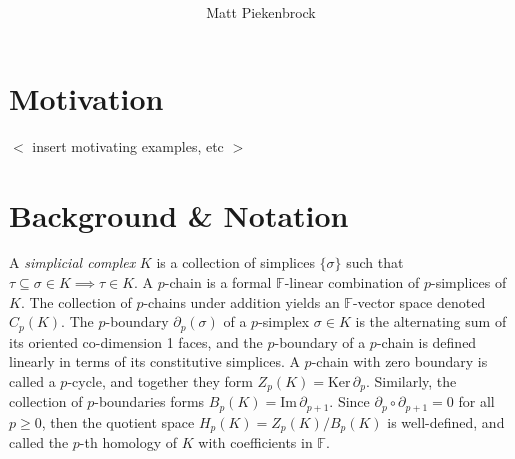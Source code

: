 \documentclass[10pt]{article}
\title{\vspace{-2.0em} \vspace{-0.5em}}
\author{Matt Piekenbrock}
\date{}
\begin{document}
\noindent

\section{Motivation}
$<$ insert motivating examples, etc $>$

\section{Background \& Notation}
A \emph{simplicial complex} $K$ is a collection of simplices $\{\sigma\}$ such that $\tau \subseteq \sigma \in K \implies \tau \in K$. A $p$-chain is a formal $\mathbb{F}$-linear combination of $p$-simplices of $K$. The collection of $p$-chains under addition yields an $\mathbb{F}$-vector space denoted $C_p(K)$. 
The $p$-boundary $\partial_p(\sigma)$ of a $p$-simplex $\sigma\in K$ is the alternating sum of its oriented co-dimension 1 faces, and the $p$-boundary of a $p$-chain is defined linearly in terms of its constitutive simplices. 
A $p$-chain with zero boundary is called a $p$-cycle, and together they form $Z_p(K) = \mathrm{Ker}\,\partial_p$. Similarly, the collection of $p$-boundaries forms  $B_p(K) = \mathrm{Im}\,\partial_{p+1}$. Since $\partial_p \circ \partial_{p+1} = 0$ for all $p\geq 0$, then the quotient space $H_p(K) = Z_p(K) / B_{p}(K)$ is well-defined, and called the $p$-th homology of $K$ with coefficients in $\mathbb{F}$. 
\end{document}
